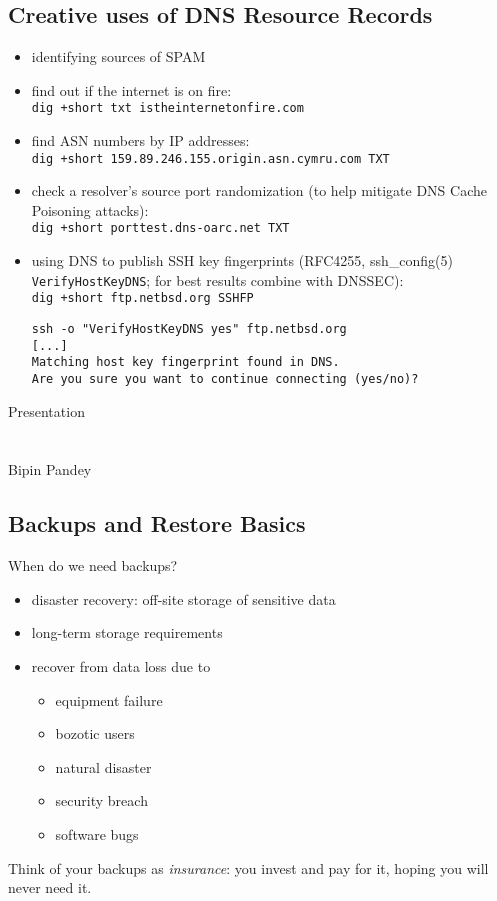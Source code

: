 \documentclass[xga]{xdvislides}
\begin{document}
\subsection{Creative uses of DNS Resource Records}
\begin{itemize}
	\item identifying sources of SPAM
	\item find out if the internet is on fire: \\
		\verb|dig +short txt istheinternetonfire.com|
	\item find ASN numbers by IP addresses: \\
		\verb|dig +short 159.89.246.155.origin.asn.cymru.com TXT|
	\item check a resolver's source port randomization (to help
		mitigate DNS Cache Poisoning attacks): \\
		\verb|dig +short porttest.dns-oarc.net TXT|
	\item using DNS to publish SSH key fingerprints (RFC4255,
ssh\_config(5) \verb+VerifyHostKeyDNS+; for best results combine with DNSSEC): \\
		\verb|dig +short ftp.netbsd.org SSHFP|
		\begin{verbatim}
ssh -o "VerifyHostKeyDNS yes" ftp.netbsd.org
[...]
Matching host key fingerprint found in DNS.
Are you sure you want to continue connecting (yes/no)?
\end{verbatim}
\end{itemize}

\newpage
\vspace*{\fill}
\begin{center}
    \Hugesize
        Presentation \\ [1em]
    \hspace*{5mm}
    \blueline\\
    \hspace*{5mm}\\
	Bipin Pandey
\end{center}
\vspace*{\fill}

\subsection{Backups and Restore Basics}
When do we need backups?
\begin{itemize}
	\item disaster recovery: off-site storage of sensitive data
	\item long-term storage requirements
	\item recover from data loss due to
		\begin{itemize}
			\item equipment failure
			\item bozotic users
			\item natural disaster
			\item security breach
			\item software bugs
		\end{itemize}
\end{itemize}
\addvspace{.5in}
Think of your backups as {\em insurance}:  you invest and pay for it, hoping
you will never need it.
\end{document}
